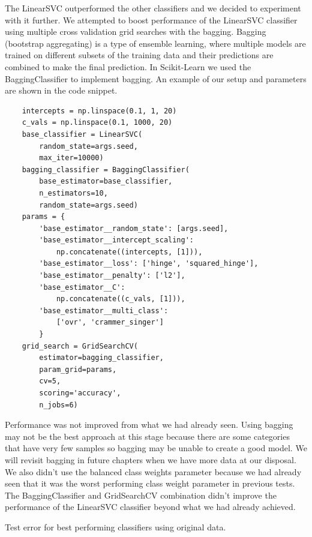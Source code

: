 The LinearSVC outperformed the other classifiers and we decided to experiment with it further. We attempted to boost performance of the LinearSVC classifier using multiple cross validation grid searches with the bagging. Bagging (bootstrap aggregating) is a type of ensemble learning, where multiple models are trained on different subsets of the training data and their predictions are combined to make the final prediction. In Scikit-Learn we used the BaggingClassifier to implement bagging. An example of our setup and parameters are shown in the code snippet. 

\begin{verbatim}
    intercepts = np.linspace(0.1, 1, 20)
    c_vals = np.linspace(0.1, 1000, 20)
    base_classifier = LinearSVC(
        random_state=args.seed, 
        max_iter=10000)
    bagging_classifier = BaggingClassifier(
        base_estimator=base_classifier, 
        n_estimators=10, 
        random_state=args.seed)
    params = {
        'base_estimator__random_state': [args.seed],
        'base_estimator__intercept_scaling': 
            np.concatenate((intercepts, [1])),
        'base_estimator__loss': ['hinge', 'squared_hinge'],
        'base_estimator__penalty': ['l2'],
        'base_estimator__C': 
            np.concatenate((c_vals, [1])),
        'base_estimator__multi_class': 
            ['ovr', 'crammer_singer']
        }
    grid_search = GridSearchCV(
        estimator=bagging_classifier, 
        param_grid=params, 
        cv=5,
        scoring='accuracy',
        n_jobs=6)
\end{verbatim}

Performance was not improved from what we had already seen. Using bagging may not be the best approach at this stage because there are some categories that have very few samples so bagging may be unable to create a good model. We will revisit bagging in future chapters when we have more data at our disposal. We also didn't use the balanced class weights parameter because we had already seen that it was the worst performing class weight parameter in previous tests. The BaggingClassifier and GridSearchCV combination didn't improve the performance of the LinearSVC classifier beyond what we had already achieved.

\begin{table}[ht]
\centering
\caption{Test error for best performing classifiers using original data.}

\label{tab:best_errors}
\end{table}


